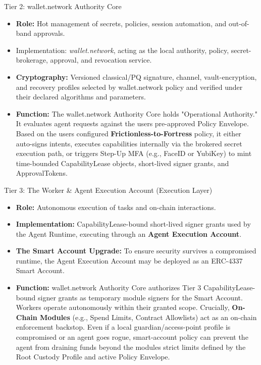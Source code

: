 \documentclass[
  11pt,
]{article}
\providecommand{\tightlist}{%
  \setlength{\itemsep}{0pt}\setlength{\parskip}{0pt}}
\begin{document}
Tier 2: wallet.network Authority Core

\begin{itemize}
\tightlist
\item
  \textbf{Role:} Hot management of secrets, policies, session
  automation, and out-of-band approvals.
\item
  Implementation: \emph{wallet.network}, acting as the local authority,
  policy, secret-brokerage, approval, and revocation service.
\item
  \textbf{Cryptography:} Versioned classical/PQ signature, channel,
  vault-encryption, and recovery profiles selected by wallet.network policy
  and verified under their declared algorithms and parameters.
\item
  \textbf{Function:} The wallet.network Authority Core holds
  "Operational Authority." It
  evaluates agent requests against the user\textquotesingle s
  pre-approved Policy Envelope. Based on the user\textquotesingle s
  configured \textbf{Frictionless-to-Fortress} policy, it either
  auto-signs intents, executes capabilities internally via the
  brokered secret execution path, or triggers Step-Up MFA (e.g., FaceID
  or YubiKey) to mint time-bounded CapabilityLease objects,
  short-lived signer grants, and ApprovalTokens.
\end{itemize}

Tier 3: The Worker \& Agent Execution Account (Execution Layer)

\begin{itemize}
\tightlist
\item
  \textbf{Role:} Autonomous execution of tasks and on-chain
  interactions.
\item
  \textbf{Implementation:} CapabilityLease-bound short-lived signer
  grants used by the Agent Runtime, executing through an
  \textbf{Agent Execution Account}.
\item
  \textbf{The Smart Account Upgrade:} To ensure security survives a
  compromised runtime, the Agent Execution Account may be deployed as an
  ERC-4337 Smart Account.
\item
  \textbf{Function:} wallet.network Authority Core authorizes Tier 3
  CapabilityLease-bound signer grants as temporary module signers for
  the Smart Account.
  Workers operate autonomously within their granted scope. Crucially,
  \textbf{On-Chain Modules} (e.g., Spend Limits, Contract Allowlists)
  act as an on-chain enforcement backstop. Even if a local
  guardian/access-point profile is compromised or an agent goes rogue,
  smart-account policy can prevent the agent from draining funds beyond the module\textquotesingle s
  strict limits defined by the Root Custody Profile and active Policy
  Envelope.
\end{itemize}
\end{document}
